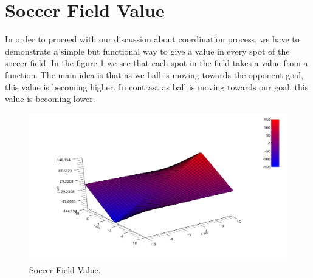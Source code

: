 \section{Soccer Field Value}
In order to proceed with our discussion about coordination process, we have to demonstrate a simple but functional way to give a value in every spot of the soccer field. In the figure \ref{fig:Value} we see that each spot in the field takes a value from a function. The main idea is that as we ball is moving towards the opponent goal,  this value is becoming higher. In contrast as ball is moving towards our goal, this value is becoming lower.  
\begin{figure}[htb!]
\centering
  \includegraphics[width=\textwidth]{Chapter4/figures/Graph1.pdf}
  \caption{Soccer Field Value.} 
  \label{fig:Value}
\end{figure}

